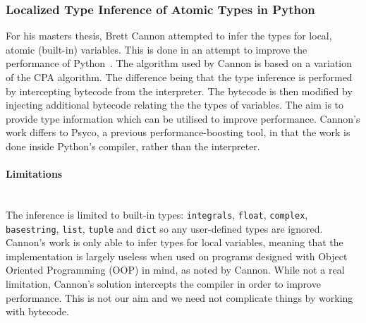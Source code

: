 \documentclass[12pt, titlepage]{article}
\begin{document}
\subsubsection{Localized Type Inference of Atomic Types in Python}
For his masters thesis, Brett Cannon attempted to infer the types for local, atomic (built-in) variables. This is done in an attempt to improve the performance of Python~\cite{cannonlocalizedtype}. The algorithm used by Cannon is based on a variation of the CPA algorithm. The difference being that the type inference is performed by intercepting bytecode from the interpreter. The bytecode is then modified by injecting additional bytecode relating the the types of variables. The aim is to provide type information which can be utilised to improve performance. Cannon's work differs to Psyco, a previous performance-boosting tool, in that the work is done inside Python's compiler, rather than the interpreter.
\paragraph{Limitations}\mbox{}\\
The inference is limited to built-in types: \texttt{integrals}, \texttt{float}, \texttt{complex}, \texttt{basestring}, \texttt{list}, \texttt{tuple} and \texttt{dict} so any user-defined types are ignored. \\
\indent Cannon's work is only able to infer types for local variables, meaning that the implementation is largely useless when used on programs designed with Object Oriented Programming (OOP) in mind, as noted by Cannon. While not a real limitation, Cannon's solution intercepts the compiler in order to improve performance. This is not our aim and we need not complicate things by working with bytecode.

\end{document}
